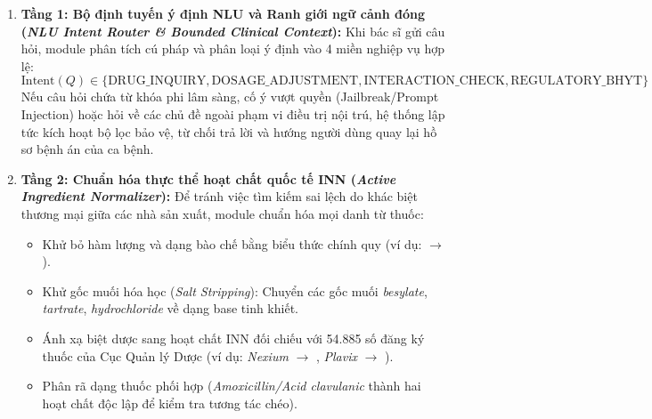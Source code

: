 \begin{enumerate}[leftmargin=2em]
    \item \textbf{Tầng 1: Bộ định tuyến ý định NLU và Ranh giới ngữ cảnh đóng (\textit{NLU Intent Router \& Bounded Clinical Context}):}
    Khi bác sĩ gửi câu hỏi, module  phân tích cú pháp và phân loại ý định vào 4 miền nghiệp vụ hợp lệ:
    \begin{equation}
        \text{Intent}(Q) \in \{\text{DRUG\_INQUIRY}, \text{DOSAGE\_ADJUSTMENT}, \text{INTERACTION\_CHECK}, \text{REGULATORY\_BHYT}\}
    \end{equation}
    Nếu câu hỏi chứa từ khóa phi lâm sàng, cố ý vượt quyền (Jailbreak/Prompt Injection) hoặc hỏi về các chủ đề ngoài phạm vi điều trị nội trú, hệ thống lập tức kích hoạt bộ lọc bảo vệ, từ chối trả lời và hướng người dùng quay lại hồ sơ bệnh án của ca bệnh.

    \item \textbf{Tầng 2: Chuẩn hóa thực thể hoạt chất quốc tế INN (\textit{Active Ingredient Normalizer}):}
    Để tránh việc tìm kiếm sai lệch do khác biệt thương mại giữa các nhà sản xuất, module  chuẩn hóa mọi danh từ thuốc:
    \begin{itemize}[leftmargin=1.5em]
        \item Khử bỏ hàm lượng và dạng bào chế bằng biểu thức chính quy (ví dụ:  $\to$ ).
        \item Khử gốc muối hóa học (\textit{Salt Stripping}): Chuyển các gốc muối \textit{besylate}, \textit{tartrate}, \textit{hydrochloride} về dạng base tinh khiết.
        \item Ánh xạ biệt dược sang hoạt chất INN đối chiếu với 54.885 số đăng ký thuốc của Cục Quản lý Dược (ví dụ: \textit{Nexium} $\to$ , \textit{Plavix} $\to$ ).
        \item Phân rã dạng thuốc phối hợp (\textit{Amoxicillin/Acid clavulanic} thành hai hoạt chất độc lập để kiểm tra tương tác chéo).
    \end{itemize}


\end{enumerate}
